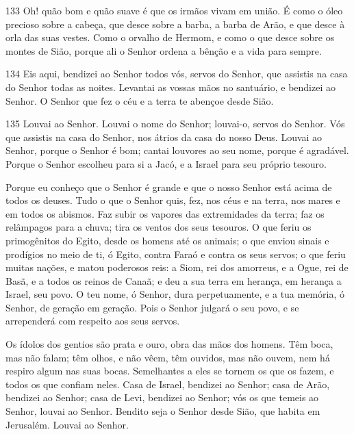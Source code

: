 \bigskip

\lettrine{133}{} Oh! quão bom e quão suave é que os irmãos vivam
em união. É como o óleo precioso sobre a cabeça, que desce sobre
a barba, a barba de Arão, e que desce à orla das suas vestes.
Como o orvalho de Hermom, e como o que desce sobre os montes de
Sião, porque ali o Senhor ordena a bênção e a vida para sempre.

\bigskip

\lettrine{134}{} Eis aqui, bendizei ao Senhor todos vós, servos
do Senhor, que assistis na casa do Senhor todas as noites.
Levantai as vossas mãos no santuário, e bendizei ao Senhor.
O Senhor que fez o céu e a terra te abençoe desde Sião.

\bigskip

\lettrine{135}{} Louvai ao Senhor. Louvai o nome do Senhor;
louvai-o, servos do Senhor. Vós que assistis na casa do Senhor,
nos átrios da casa do nosso Deus. Louvai ao Senhor, porque o
Senhor é bom; cantai louvores ao seu nome, porque é agradável.
Porque o Senhor escolheu para si a Jacó, e a Israel para seu
próprio tesouro.

Porque eu conheço que o Senhor é grande e que o nosso Senhor está
acima de todos os deuses. Tudo o que o Senhor quis, fez, nos
céus e na terra, nos mares e em todos os abismos. Faz subir os
vapores das extremidades da terra; faz os relâmpagos para a chuva;
tira os ventos dos seus tesouros. O que feriu os primogênitos do
Egito, desde os homens até os animais; o que enviou sinais e
prodígios no meio de ti, ó Egito, contra Faraó e contra os seus
servos; o que feriu muitas nações, e matou poderosos reis:
a Siom, rei dos amorreus, e a Ogue, rei de Basã, e a todos os
reinos de Canaã; e deu a sua terra em herança, em herança a
Israel, seu povo. O teu nome, ó Senhor, dura perpetuamente, e
a tua memória, ó Senhor, de geração em geração. Pois o Senhor
julgará o seu povo, e se arrependerá com respeito aos seus servos.

Os ídolos dos gentios são prata e ouro, obra das mãos dos homens.
Têm boca, mas não falam; têm olhos, e não vêem, têm
ouvidos, mas não ouvem, nem há respiro algum nas suas bocas.
Semelhantes a eles se tornem os que os fazem, e todos os que
confiam neles. Casa de Israel, bendizei ao Senhor; casa de
Arão, bendizei ao Senhor; casa de Levi, bendizei ao Senhor;
vós os que temeis ao Senhor, louvai ao Senhor. Bendito seja o
Senhor desde Sião, que habita em Jerusalém. Louvai ao Senhor.

\bigskip

